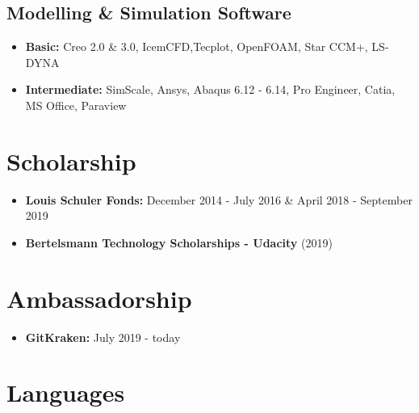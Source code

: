 \documentclass[11pt,a4paper,sans]{moderncv}        %
\begin{document}
\vspace{6pt}

\subsection{Modelling \& Simulation Software}

\vspace{3pt}

\begin{itemize}

\setlength\itemsep{1em}

\item \textbf{Basic:} Creo 2.0 \& 3.0, IcemCFD,Tecplot, OpenFOAM, Star CCM+, LS-DYNA

\item \textbf{Intermediate:} SimScale, Ansys, Abaqus 6.12 - 6.14, Pro Engineer, Catia, MS Office, Paraview

\end{itemize}

\vspace{6pt}

\section{Scholarship}

\begin{itemize}
	
	\setlength\itemsep{1em}
	
	\item \textbf{Louis Schuler Fonds:}  December 2014 - July 2016 \& April 2018 - September 2019
	
	\item \textbf{Bertelsmann Technology Scholarships - Udacity} (2019)
	
\end{itemize}

\section{Ambassadorship}

\begin{itemize}

\setlength\itemsep{1em}

\item \textbf{GitKraken:}  July 2019 - today

\end{itemize}

\section{Languages}
\end{document}
